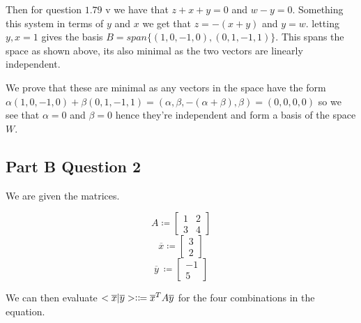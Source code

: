 \documentclass{article}
\begin{document}
Then for question $1.79$ v we have that $z+x+y = 0$ and $w -y = 0$. Something this system in terms of $y$ and $x$ we get that $z = -(x+y)$ and $y = w$. letting $y,x = 1$ gives the basis $B = span\{ (1,0,-1,0 ), ( 0, 1, -1, 1) \}$. This spans the space as shown above, its also minimal as the two vectors are linearly independent. 

We prove that these are minimal as any vectors in the space have the form $\alpha (1,0,-1,0 ) + \beta ( 0, 1, -1, 1) = (\alpha, \beta, -(\alpha +\beta), \beta) = (0,0,0,0)$ so we see that $\alpha = 0$ and $\beta = 0$ hence they're independent and form a basis of the space $W$.


\subsection{Part B Question 2}
We are given the matrices.

\begin{equation*}
    A  \coloneqq \begin{bmatrix}
        1 & 2\\3&4 
    \end{bmatrix}
\end{equation*}
\begin{equation*}
    \overline{x}  \coloneqq \begin{bmatrix}
        3 \\ 2
    \end{bmatrix}
\end{equation*}
\begin{equation*}
    \overline{y} \ \coloneqq \begin{bmatrix}
        -1 \\ 5
    \end{bmatrix} 
\end{equation*}

We can then evaluate $<\overline{x}|\overline{y}> \vcentcolon \coloneqq \overline{x}^TA\overline{y}$ for the four combinations in the equation.
\end{document}
